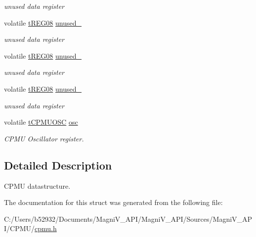 \begin{DoxyCompactItemize}
\begin{DoxyCompactList}\small\item\em unused data register \end{DoxyCompactList}\item 
\hypertarget{structt_c_p_m_u_a33ea9b9877d02513adec8a8248a4b724}{}volatile \hyperlink{unionu_r_e_g08}{t\+R\+E\+G08} \hyperlink{structt_c_p_m_u_a33ea9b9877d02513adec8a8248a4b724}{unused\+\_}\label{structt_c_p_m_u_a33ea9b9877d02513adec8a8248a4b724}

\begin{DoxyCompactList}\small\item\em unused data register \end{DoxyCompactList}\item 
\hypertarget{structt_c_p_m_u_ac44216978c6388289cc5c16223848f79}{}volatile \hyperlink{unionu_r_e_g08}{t\+R\+E\+G08} \hyperlink{structt_c_p_m_u_ac44216978c6388289cc5c16223848f79}{unused\+\_}\label{structt_c_p_m_u_ac44216978c6388289cc5c16223848f79}

\begin{DoxyCompactList}\small\item\em unused data register \end{DoxyCompactList}\item 
\hypertarget{structt_c_p_m_u_aa47ce658416e0f0e602ac6c020fe39f5}{}volatile \hyperlink{unionu_r_e_g08}{t\+R\+E\+G08} \hyperlink{structt_c_p_m_u_aa47ce658416e0f0e602ac6c020fe39f5}{unused\+\_}\label{structt_c_p_m_u_aa47ce658416e0f0e602ac6c020fe39f5}

\begin{DoxyCompactList}\small\item\em unused data register \end{DoxyCompactList}\item 
\hypertarget{structt_c_p_m_u_a98710174c0e11fda341a55e925410e4a}{}volatile \hyperlink{unionu_c_p_m_u_o_s_c}{t\+C\+P\+M\+U\+O\+S\+C} \hyperlink{structt_c_p_m_u_a98710174c0e11fda341a55e925410e4a}{osc}\label{structt_c_p_m_u_a98710174c0e11fda341a55e925410e4a}

\begin{DoxyCompactList}\small\item\em C\+P\+M\+U Oscillator register. \end{DoxyCompactList}\end{DoxyCompactItemize}


\subsection{Detailed Description}
C\+P\+M\+U datastructure. 

The documentation for this struct was generated from the following file\+:\begin{DoxyCompactItemize}
\item 
C\+:/\+Users/b52932/\+Documents/\+Magni\+V\+\_\+\+A\+P\+I/\+Magni\+V\+\_\+\+A\+P\+I/\+Sources/\+Magni\+V\+\_\+\+A\+P\+I/\+C\+P\+M\+U/\hyperlink{cpmu_8h}{cpmu.\+h}\end{DoxyCompactItemize}
